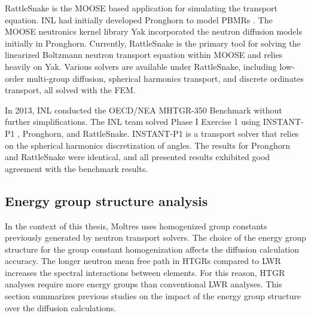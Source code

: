 RattleSnake \cite{wang_rattlesnake_2019} is the MOOSE \cite{gaston_moose_2009} based application for simulating the transport equation.
\gls{INL} had initially developed Pronghorn \cite{novak_pronghorn_2018} to model \glspl{PBMR} \cite{strydom_inl_2013}.
The MOOSE neutronics kernel library Yak incorporated the neutron diffusion models initially in Pronghorn.
Currently, RattleSnake is the primary tool for solving the linearized Boltzmann neutron transport equation within MOOSE and relies heavily on Yak.
Various solvers are available under RattleSnake, including low-order multi-group diffusion, spherical harmonics transport, and discrete ordinates transport, all solved with the \gls{FEM}.

In 2013, \gls{INL} conducted the OECD/NEA MHTGR-350 Benchmark \cite{oecd_nea_benchmark_2017}\cite{strydom_inl_2013} without further simplifications.
The \gls{INL} team solved Phase I Exercise 1 using INSTANT-P1 \cite{wang_krylov_2011}, Pronghorn, and RattleSnake.
INSTANT-P1 is a transport solver that relies on the spherical harmonics discretization of angles.
The results for Pronghorn and RattleSnake were identical, and all presented results exhibited good agreement with the benchmark results.

\subsection{Energy group structure analysis}
\label{sec:energy-struct}

In the context of this thesis, Moltres uses homogenized group constants previously generated by neutron transport solvers.
The choice of the energy group structure for the group constant homogenization affects the diffusion calculation accuracy.
The longer neutron mean free path in \glspl{HTGR} compared to \gls{LWR} increases the spectral interactions between elements.
For this reason, HTGR analyses require more energy groups than conventional \gls{LWR} analyses.
This section summarizes previous studies on the impact of the energy group structure over the diffusion calculations.

